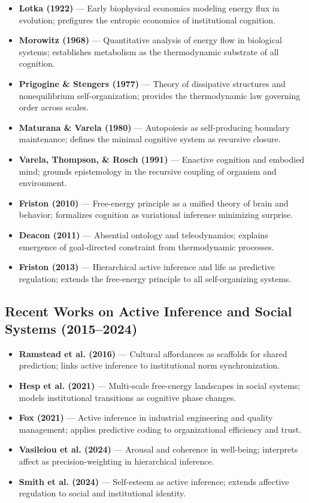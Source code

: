 \documentclass[11pt,a4paper]{article}
\begin{document}
\begin{itemize}
    \item \textbf{Lotka (1922)} — Early biophysical economics modeling energy flux in evolution; prefigures the entropic economics of institutional cognition.
    \item \textbf{Morowitz (1968)} — Quantitative analysis of energy flow in biological systems; establishes metabolism as the thermodynamic substrate of all cognition.
    \item \textbf{Prigogine \& Stengers (1977)} — Theory of dissipative structures and nonequilibrium self-organization; provides the thermodynamic law governing order across scales.
    \item \textbf{Maturana \& Varela (1980)} — Autopoiesis as self-producing boundary maintenance; defines the minimal cognitive system as recursive closure.
    \item \textbf{Varela, Thompson, \& Rosch (1991)} — Enactive cognition and embodied mind; grounds epistemology in the recursive coupling of organism and environment.
    \item \textbf{Friston (2010)} — Free-energy principle as a unified theory of brain and behavior; formalizes cognition as variational inference minimizing surprise.
    \item \textbf{Deacon (2011)} — Absential ontology and teleodynamics; explains emergence of goal-directed constraint from thermodynamic processes.
    \item \textbf{Friston (2013)} — Hierarchical active inference and life as predictive regulation; extends the free-energy principle to all self-organizing systems.
\end{itemize}

\subsection*{Recent Works on Active Inference and Social Systems (2015–2024)}

\begin{itemize}
    \item \textbf{Ramstead et al. (2016)} — Cultural affordances as scaffolds for shared prediction; links active inference to institutional norm synchronization.
    \item \textbf{Hesp et al. (2021)} — Multi-scale free-energy landscapes in social systems; models institutional transitions as cognitive phase changes.
    \item \textbf{Fox (2021)} — Active inference in industrial engineering and quality management; applies predictive coding to organizational efficiency and trust.
    \item \textbf{Vasileiou et al. (2024)} — Arousal and coherence in well-being; interprets affect as precision-weighting in hierarchical inference.
    \item \textbf{Smith et al. (2024)} — Self-esteem as active inference; extends affective regulation to social and institutional identity.
\end{itemize}


\newpage


\end{document}

